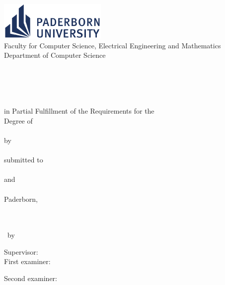 \addtolength{\oddsidemargin}{0.75cm}
\begin{titlepage}
	\begin{center}
		\begin{minipage}{13.5cm}		
			\includegraphics{../figures/logo} \\[3pt]
			\textsf{
				\hspace*{2.2cm} Faculty for Computer Science, Electrical Engineering and Mathematics \\
				\hspace*{2.2cm} Department of Computer Science \\
				\hspace*{2.2cm} \ResearchGroup \\
				\hspace*{2.2cm} \Address
			}
		\end{minipage}\\[60pt]

		{\Huge\textbf{\Title}} \\[30pt]

		{\LARGE \ThesisType } \\[15pt]
		in Partial Fulfillment of the Requirements for the \\
		Degree of \\[15pt]
		{\Large \Degree} \\[30pt]

		by \\[5pt]

		{\scshape\large \Author} \\[30pt]

		submitted to \\[5pt]

		{\scshape\large \Supervisor} \\[5pt]

		and \\[5pt]

		{\scshape\large \SecondExaminer} \\[40pt]

		{Paderborn, \DateOfSubmission}
	\end{center}
\end{titlepage}
\addtolength{\oddsidemargin}{-0.75cm}

\newpage
	~\ \\[430pt]

	\textcopyright~\CopyrightYear~\Author
	\ \\

	\ThesisType~by \Author

	Supervisor: \Supervisor
	\ \\

	First examiner: \Supervisor

	Second examiner: \SecondExaminer
